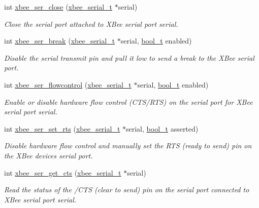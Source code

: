 \begin{DoxyCompactItemize}
int \hyperlink{group__xbee__serial_ga48b9d743a446074ea6abacd0de24044d}{xbee\+\_\+ser\+\_\+close} (\hyperlink{structxbee__serial__t}{xbee\+\_\+serial\+\_\+t} $\ast$serial)
\begin{DoxyCompactList}\small\item\em Close the serial port attached to X\+Bee serial port {\itshape serial}. \end{DoxyCompactList}\item 
int \hyperlink{group__xbee__serial_gae19aa61eec588d1b935d267b0a982319}{xbee\+\_\+ser\+\_\+break} (\hyperlink{structxbee__serial__t}{xbee\+\_\+serial\+\_\+t} $\ast$serial, \hyperlink{group__hal__dos_ga04dd5074964518403bf944f2b240a5f8}{bool\+\_\+t} enabled)
\begin{DoxyCompactList}\small\item\em Disable the serial transmit pin and pull it low to send a break to the X\+Bee serial port. \end{DoxyCompactList}\item 
int \hyperlink{group__xbee__serial_ga33229d0d63ff1442f23b0739794d3afb}{xbee\+\_\+ser\+\_\+flowcontrol} (\hyperlink{structxbee__serial__t}{xbee\+\_\+serial\+\_\+t} $\ast$serial, \hyperlink{group__hal__dos_ga04dd5074964518403bf944f2b240a5f8}{bool\+\_\+t} enabled)
\begin{DoxyCompactList}\small\item\em Enable or disable hardware flow control (C\+T\+S/\+R\+TS) on the serial port for X\+Bee serial port {\itshape serial}. \end{DoxyCompactList}\item 
int \hyperlink{group__xbee__serial_gad1b1f9f42e58d8299ddcca1c9cb3c5e8}{xbee\+\_\+ser\+\_\+set\+\_\+rts} (\hyperlink{structxbee__serial__t}{xbee\+\_\+serial\+\_\+t} $\ast$serial, \hyperlink{group__hal__dos_ga04dd5074964518403bf944f2b240a5f8}{bool\+\_\+t} asserted)
\begin{DoxyCompactList}\small\item\em Disable hardware flow control and manually set the R\+TS (ready to send) pin on the X\+Bee device\textquotesingle{}s serial port. \end{DoxyCompactList}\item 
int \hyperlink{group__xbee__serial_ga894f6fadc890b5ba5ce32338f0acd217}{xbee\+\_\+ser\+\_\+get\+\_\+cts} (\hyperlink{structxbee__serial__t}{xbee\+\_\+serial\+\_\+t} $\ast$serial)
\begin{DoxyCompactList}\small\item\em Read the status of the /\+C\+TS (clear to send) pin on the serial port connected to X\+Bee serial port {\itshape serial}. \end{DoxyCompactList}\end{DoxyCompactItemize}



